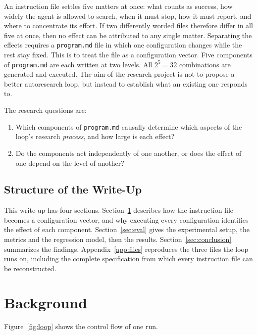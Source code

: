 \documentclass[11pt]{article}
\begin{document}
An instruction file settles five matters at once: what counts as success, how widely the agent is allowed to search, when it must stop, how it must report, and where to concentrate its effort. If two differently worded files therefore differ in all five at once, then no effect can be attributed to any single matter. Separating the effects requires a \texttt{program.md} file in which one configuration changes while the rest stay fixed. This is to treat the file as a configuration vector. Five components of \texttt{program.md} are each written at two levels. All $2^5 = 32$ combinations are generated and executed. The aim of the research project is not to propose a better autoresearch loop, but instead to establish what an existing one responds to.

The research questions are:

\begin{enumerate}
\item[\textbf{RQ1}] Which components of \texttt{program.md} causally determine which aspects of the loop's research \emph{process}, and how large is each effect?
\item[\textbf{RQ2}] Do the components act independently of one another, or does the effect of one depend on the level of another?
\end{enumerate}

\subsection{Structure of the Write-Up}

This write-up has four sections. Section~\ref{sec:background} describes how the instruction file becomes a configuration vector, and why executing every configuration identifies the effect of each component. Section~\ref{sec:eval} gives the experimental setup, the metrics and the regression model, then the results. Section~\ref{sec:conclusion} summarizes the findings. Appendix~\ref{app:files} reproduces the three files the loop runs on, including the complete specification from which every instruction file can be reconstructed.


\section{Background}
\label{sec:background}

Figure~\ref{fig:loop} shows the control flow of one run.
\end{document}
